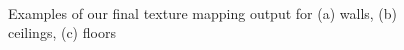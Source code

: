 \documentclass[]{spie}  %
\begin{document}
\begin{figure}
  \centering
   \\

  \centering {}
  \caption{Examples of our final texture mapping output for (a) walls,
    (b) ceilings, (c) floors}
  \label{fig:indivPlanes}
\end{figure}
\end{document}
